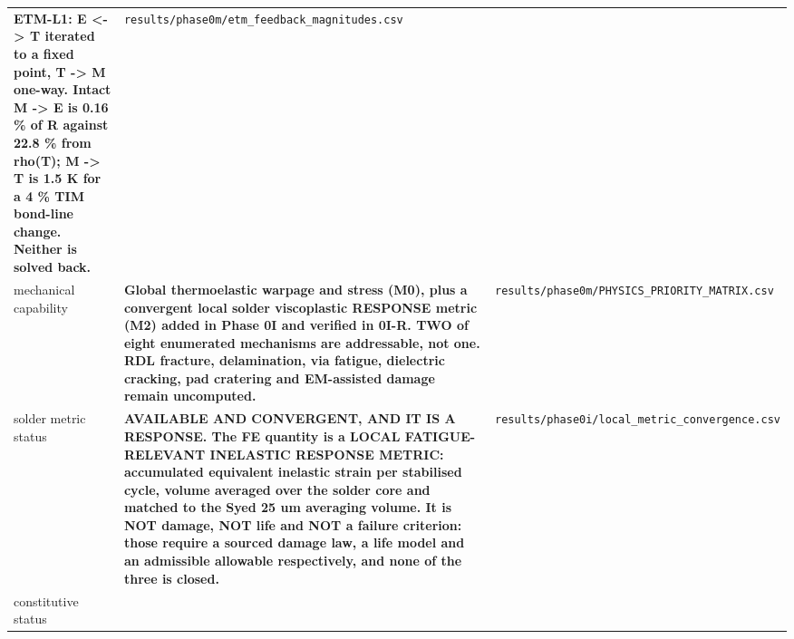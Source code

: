 \documentclass[10pt,]{article}
\begin{document}
\begin{longtable}[]{@{}lll@{}}
\begin{minipage}[t]{0.30\columnwidth}
\textbf{ETM-L1: E \textless{}-\textgreater{} T iterated to a fixed
point, T -\textgreater{} M one-way. Intact M -\textgreater{} E is 0.16
\% of R against 22.8 \% from rho(T); M -\textgreater{} T is 1.5 K for a
4 \% TIM bond-line change. Neither is solved back.}\strut
\end{minipage} & \begin{minipage}[t]{0.30\columnwidth}\raggedright
\texttt{results/phase0m/etm\_feedback\_magnitudes.csv}\strut
\end{minipage}\tabularnewline
\begin{minipage}[t]{0.30\columnwidth}\raggedright
mechanical capability\strut
\end{minipage} & \begin{minipage}[t]{0.30\columnwidth}\raggedright
\textbf{Global thermoelastic warpage and stress (M0), plus a convergent
local solder viscoplastic RESPONSE metric (M2) added in Phase 0I and
verified in 0I-R. TWO of eight enumerated mechanisms are addressable,
not one. RDL fracture, delamination, via fatigue, dielectric cracking,
pad cratering and EM-assisted damage remain uncomputed.}\strut
\end{minipage} & \begin{minipage}[t]{0.30\columnwidth}\raggedright
\texttt{results/phase0m/PHYSICS\_PRIORITY\_MATRIX.csv}\strut
\end{minipage}\tabularnewline
\begin{minipage}[t]{0.30\columnwidth}\raggedright
solder metric status\strut
\end{minipage} & \begin{minipage}[t]{0.30\columnwidth}\raggedright
\textbf{AVAILABLE AND CONVERGENT, AND IT IS A RESPONSE. The FE quantity
is a LOCAL FATIGUE-RELEVANT INELASTIC RESPONSE METRIC: accumulated
equivalent inelastic strain per stabilised cycle, volume averaged over
the solder core and matched to the Syed 25 um averaging volume. It is
NOT damage, NOT life and NOT a failure criterion: those require a
sourced damage law, a life model and an admissible allowable
respectively, and none of the three is closed.}\strut
\end{minipage} & \begin{minipage}[t]{0.30\columnwidth}\raggedright
\texttt{results/phase0i/local\_metric\_convergence.csv}\strut
\end{minipage}\tabularnewline
\begin{minipage}[t]{0.30\columnwidth}\raggedright
constitutive status\strut
\end{minipage} & \begin{minipage}[t]{0.30\columnwidth}\raggedright

\end{minipage}
\end{longtable}
\end{document}
